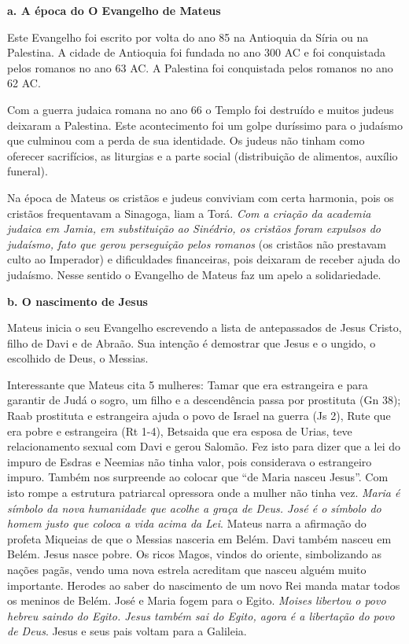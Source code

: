 \documentclass[
]{book}
\begin{document}
\textbf{a. A época do O Evangelho de Mateus}

Este Evangelho foi escrito por volta do ano 85 na Antioquia da Síria ou na Palestina. A cidade de Antioquia foi fundada no ano 300 AC e foi conquistada pelos romanos no ano 63 AC. A Palestina foi conquistada pelos romanos no ano 62 AC.

Com a guerra judaica romana no ano 66 o Templo foi destruído e muitos judeus deixaram a Palestina. Este acontecimento foi um golpe duríssimo para o judaísmo que culminou com a perda de sua identidade. Os judeus não tinham como oferecer sacrifícios, as liturgias e a parte social (distribuição de alimentos, auxílio funeral).

Na época de Mateus os cristãos e judeus conviviam com certa harmonia, pois os cristãos frequentavam a Sinagoga, liam a Torá. \emph{Com a criação da academia judaica em Jamia, em substituição ao Sinédrio, os cristãos foram expulsos do judaísmo, fato que gerou perseguição pelos romanos} (os cristãos não prestavam culto ao Imperador) e dificuldades financeiras, pois deixaram de receber ajuda do judaísmo. Nesse sentido o Evangelho de Mateus faz um apelo a solidariedade.

\textbf{b. O nascimento de Jesus}

Mateus inicia o seu Evangelho escrevendo a lista de antepassados de Jesus Cristo, filho de Davi e de Abraão. Sua intenção é demostrar que Jesus e o ungido, o escolhido de Deus, o Messias.

Interessante que Mateus cita 5 mulheres: Tamar que era estrangeira e para garantir de Judá o sogro, um filho e a descendência passa por prostituta (Gn 38); Raab prostituta e estrangeira ajuda o povo de Israel na guerra (Js 2), Rute que era pobre e estrangeira (Rt 1-4), Betsaida que era esposa de Urias, teve relacionamento sexual com Davi e gerou Salomão. Fez isto para dizer que a lei do impuro de Esdras e Neemias não tinha valor, pois considerava o estrangeiro impuro. Também nos surpreende ao colocar que ``de Maria nasceu Jesus''. Com isto rompe a estrutura patriarcal opressora onde a mulher não tinha vez. \emph{Maria é símbolo da nova humanidade que acolhe a graça de Deus. José é o símbolo do homem justo que coloca a vida acima da Lei}. Mateus narra a afirmação do profeta Miqueias de que o Messias nasceria em Belém. Davi também nasceu em Belém. Jesus nasce pobre. Os ricos Magos, vindos do oriente, simbolizando as nações pagãs, vendo uma nova estrela acreditam que nasceu alguém muito importante. Herodes ao saber do nascimento de um novo Rei manda matar todos os meninos de Belém. José e Maria fogem para o Egito. \emph{Moises libertou o povo hebreu saindo do Egito. Jesus também sai do Egito, agora é a libertação do povo de Deus}. Jesus e seus pais voltam para a Galileia.
\end{document}
